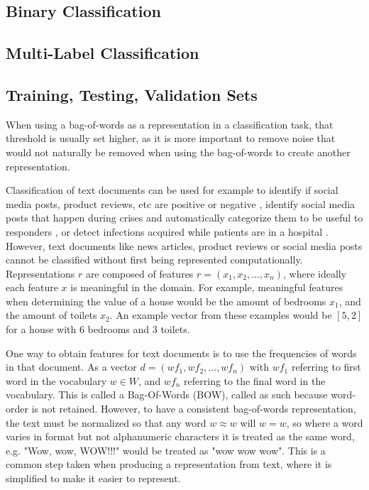 \subsection{Binary Classification}
\subsection{Multi-Label Classification}
\subsection{Training, Testing, Validation Sets}

When using a bag-of-words as a representation in a classification task, that threshold is usually set higher, as it is more important to remove noise that would not naturally be removed when using the bag-of-words to create another representation. 

Classification of text documents can be used for example to identify if social media posts, product reviews, etc are positive or negative \cite{Burel2018},  identify social media posts that happen during crises and automatically categorize them to be useful to responders \cite{Burel2018},  or detect infections acquired while patients are in a hospital . However, text documents like news articles, product reviews or social media posts cannot be classified without first being represented computationally.  Representations $r$ are composed of features $r = (x_1, x_2, ..., x_n)$, where ideally each feature $x$  is meaningful in the domain. For example, meaningful features when determining the  value of a house would be the amount of bedrooms $x_1$, and the amount of toilets $x_2$. An example vector from these examples would be $[5,2]$ for a house with 6 bedrooms and 3 toilets.

One way to obtain features for text documents is to use the frequencies of words in that document. As a vector $d = ({wf}_1, {wf}_2, ..., {wf}_n)$ with ${wf}_1$ referring to first word in the vocabulary $w \in W$, and ${wf}_n$  referring to the final word in the vocabulary. This is called a Bag-Of-Words (BOW), called as such because word-order is not retained. However, to have a consistent bag-of-words representation, the text must be normalized so that any word $w \approx w$ will  $w = w$, so where a word varies in format but not alphanumeric characters it is treated as the same word, e.g. "Wow, wow, WOW!!!" would be treated as  "wow wow wow". This is a common step taken when producing a representation from text, where it is simplified to make it easier to represent.

